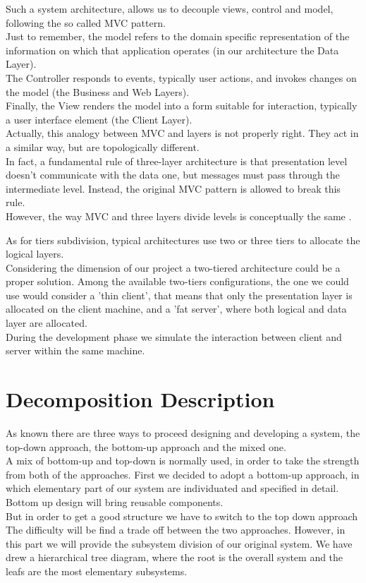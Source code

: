 \documentclass[12pt]{book}
\begin{document}
Such a system architecture, allows us to decouple views, control and model, following the so called 
MVC pattern.\\ Just to remember, the model refers to the domain specific representation of the information on which that application operates (in our architecture the Data Layer). \\
The Controller responds to events, typically user actions, and invokes changes on the model (the Business and Web Layers).\\
Finally, the View renders the model into a form suitable for interaction, typically a user interface element (the Client Layer).\\
Actually, this analogy between MVC and layers is not properly right. They act in a similar way, but are topologically different. \\
In fact, a fundamental rule of three-layer architecture is that presentation level doesn't communicate with the data one, but messages must pass through the intermediate level. Instead, the original MVC pattern is allowed to break this rule. \\
However, the way MVC and three layers divide levels is conceptually the same . 

As for tiers subdivision, typical architectures use two or three tiers to allocate the logical layers. \\
Considering the dimension of our project a two-tiered architecture could be a proper solution. Among the available two-tiers configurations, the one we could use would consider a 'thin client', that means that only the presentation layer is allocated on the client machine, and a 'fat server', where both logical and data layer are allocated. \\
During the development phase we simulate the interaction between client and server within the same machine. \\
\section{Decomposition Description}
As known there are three ways to proceed designing and developing a system, the top-down approach, the bottom-up approach and the mixed one. \\
A mix of bottom-up and top-down is normally used, in order to take the strength from both of the approaches. First we decided to adopt a bottom-up approach, in which elementary part of our system are individuated and specified in detail. Bottom up design will bring reusable components. \\
But in order to get a good structure we have to switch to the top down approach\\ 
The difficulty will be find a trade off between the two approaches.
However, in this part we will provide the subsystem division of our original system. We have drew a hierarchical tree diagram, where the root is the overall system and the leafs are the most elementary subsystems. \\
\end{document}
